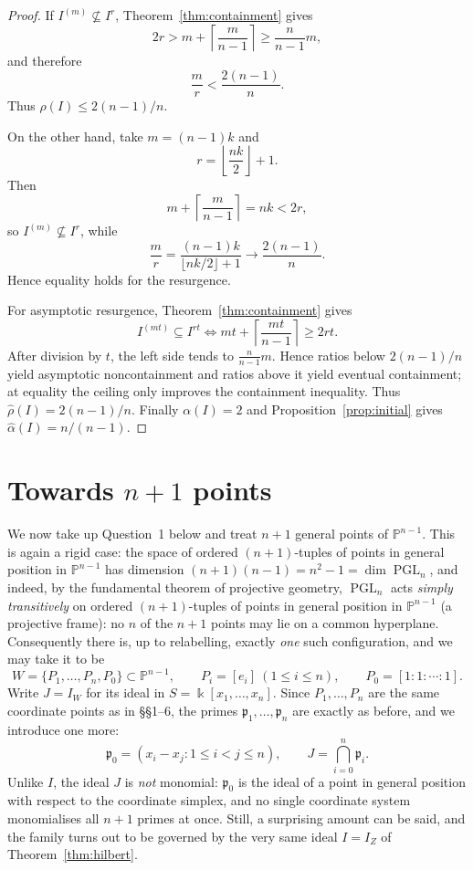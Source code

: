 \documentclass[11pt]{article}
\newcommand{\PP}{\mathbb P}
\newcommand{\p}{\mathfrak p}
\newcommand{\Res}{\rho}
\newcommand{\aRes}{\widehat{\rho}}
\newcommand{\walpha}{\widehat{\alpha}}
\begin{document}
\begin{proof}
If \(I^{(m)}\not\subseteq I^r\), Theorem~\ref{thm:containment} gives
\[
 2r>
 m+\left\lceil\frac{m}{n-1}\right\rceil
 \ge \frac{n}{n-1}m,
\]
and therefore
\[
 \frac mr<\frac{2(n-1)}n.
\]
Thus \(\Res(I)\le2(n-1)/n\).

On the other hand, take \(m=(n-1)k\) and
\[
 r=\left\lfloor\frac{nk}{2}\right\rfloor+1.
\]
Then
\[
 m+\left\lceil\frac{m}{n-1}\right\rceil=nk<2r,
\]
so \(I^{(m)}\not\subseteq I^r\), while
\[
 \frac mr
 =
 \frac{(n-1)k}{\lfloor nk/2\rfloor+1}
 \longrightarrow
 \frac{2(n-1)}n.
\]
Hence equality holds for the resurgence.

For asymptotic resurgence, Theorem~\ref{thm:containment} gives
\[
 I^{(mt)}\subseteq I^{rt}
 \Longleftrightarrow
 mt+\left\lceil\frac{mt}{n-1}\right\rceil\ge2rt.
\]
After division by \(t\), the left side tends to
\(\frac{n}{n-1}m\).  Hence ratios below \(2(n-1)/n\) yield
asymptotic noncontainment and ratios above it yield eventual
containment; at equality the ceiling only improves the containment
inequality.  Thus \(\aRes(I)=2(n-1)/n\).
Finally \(\alpha(I)=2\) and
Proposition~\ref{prop:initial} gives
\(\walpha(I)=n/(n-1)\).
\end{proof}

\section{Towards \(n+1\) points}
\label{sec:nplus1}

We now take up Question~1 below and treat \(n+1\) general points of
\(\PP^{n-1}\).  This is again a rigid case: the space of ordered
\((n+1)\)-tuples of points in general position in \(\PP^{n-1}\) has
dimension \((n+1)(n-1)=n^2-1=\dim\operatorname{PGL}_n\), and indeed,
by the fundamental theorem of projective geometry, \(\operatorname{PGL}_n\)
acts \emph{simply transitively} on ordered \((n+1)\)-tuples of points
in general position in \(\PP^{n-1}\) (a projective frame): no \(n\) of
the \(n+1\) points may lie on a common hyperplane.  Consequently there
is, up to relabelling, exactly \emph{one} such configuration, and we
may take it to be
\[
 W=\{P_1,\dots,P_n,P_0\}\subset\PP^{n-1},
 \qquad
 P_i=[e_i]\ (1\le i\le n),
 \qquad
 P_0=[1:1:\cdots:1].
\]
Write \(J=I_W\) for its ideal in \(S=\Bbbk[x_1,\dots,x_n]\).  Since
\(P_1,\dots,P_n\) are the same coordinate points as in
\S\S1--6, the primes \(\p_1,\dots,\p_n\) are exactly as before, and we
introduce one more:
\[
 \p_0=(x_i-x_j:1\le i<j\le n),
 \qquad
 J=\bigcap_{i=0}^n\p_i.
\]
Unlike \(I\), the ideal \(J\) is \emph{not} monomial: \(\p_0\) is the
ideal of a point in general position with respect to the coordinate
simplex, and no single coordinate system monomialises all \(n+1\)
primes at once.  Still, a surprising amount can be said, and the
family turns out to be governed by the very same ideal \(I=I_Z\) of
Theorem~\ref{thm:hilbert}.
\end{document}
